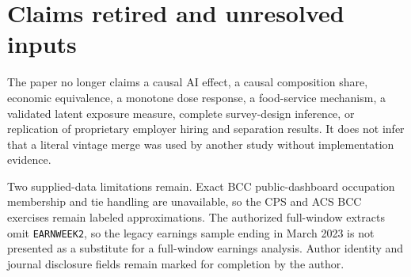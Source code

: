 \documentclass[11pt,letterpaper]{article}
\begin{document}
\section*{Claims retired and unresolved inputs}

The paper no longer claims a causal AI effect, a causal composition share, economic equivalence, a monotone dose response, a food-service mechanism, a validated latent exposure measure, complete survey-design inference, or replication of proprietary employer hiring and separation results.  It does not infer that a literal vintage merge was used by another study without implementation evidence.

Two supplied-data limitations remain.  Exact BCC public-dashboard occupation membership and tie handling are unavailable, so the CPS and ACS BCC exercises remain labeled approximations.  The authorized full-window extracts omit \texttt{EARNWEEK2}, so the legacy earnings sample ending in March 2023 is not presented as a substitute for a full-window earnings analysis.  Author identity and journal disclosure fields remain marked for completion by the author.
\end{document}
